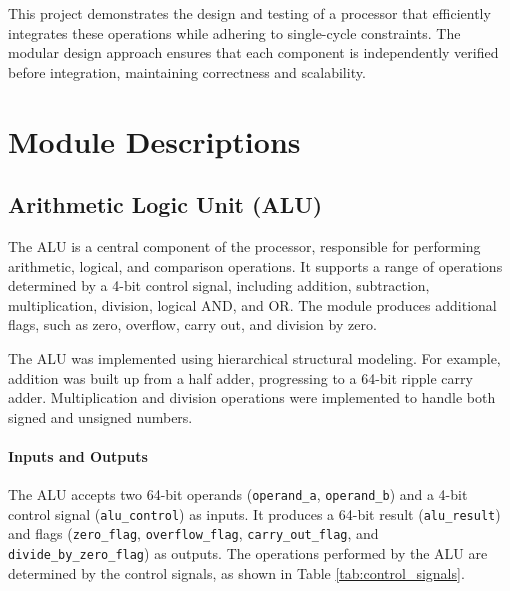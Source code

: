 \documentclass[12pt]{article}
\begin{document}
This project demonstrates the design and testing of a processor that efficiently integrates these operations while adhering to single-cycle constraints. The modular design approach ensures that each component is independently verified before integration, maintaining correctness and scalability.

\section*{Module Descriptions}

\subsection*{Arithmetic Logic Unit (ALU)}

The ALU is a central component of the processor, responsible for performing arithmetic, logical, and comparison operations. It supports a range of operations determined by a 4-bit control signal, including addition, subtraction, multiplication, division, logical AND, and OR. The module produces additional flags, such as zero, overflow, carry out, and division by zero.

The ALU was implemented using hierarchical structural modeling. For example, addition was built up from a half adder, progressing to a 64-bit ripple carry adder. Multiplication and division operations were implemented to handle both signed and unsigned numbers.

\paragraph{Inputs and Outputs}
The ALU accepts two 64-bit operands (\texttt{operand\_a}, \texttt{operand\_b}) and a 4-bit control signal (\texttt{alu\_control}) as inputs. It produces a 64-bit result (\texttt{alu\_result}) and flags (\texttt{zero\_flag}, \texttt{overflow\_flag}, \texttt{carry\_out\_flag}, and \texttt{divide\_by\_zero\_flag}) as outputs. The operations performed by the ALU are determined by the control signals, as shown in Table \ref{tab:control_signals}.
\end{document}
